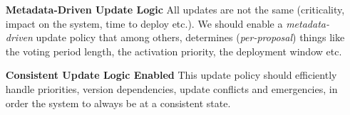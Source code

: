 \begin{itemize}
	\item[\textbf{Metadata-Driven Update Logic}] All updates are not the same
	(criticality,
	impact on the system, time to deploy etc.). We should enable a
	\emph{metadata-driven} update policy that among others, determines 
	(\emph{per-proposal}) things 
	like the  voting period length, the activation priority, the deployment 
	window etc. 
	
	\item[\textbf{Consistent Update Logic Enabled}] This update policy should 
	efficiently handle
	priorities, version dependencies, update conflicts and emergencies, in
	order the system to always be at a consistent state.
	
\end{itemize}
